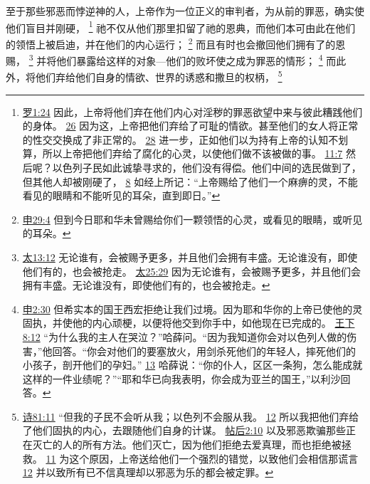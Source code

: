 \documentclass[12pt, a4paper, oneside]{ctexart}
\newcounter{parnum}[section]
\newcommand{\N}{%
   \noindent\refstepcounter{parnum}%
    \makebox[\parindent][l]{\textbf{\arabic{parnum}.}}}
\begin{document}
\N 至于那些邪恶而悖逆神的人，上帝作为一位正义的审判者，为从前的罪恶，确实使他们盲目并刚硬，
	\footnote {
		\href{https://biblehub.com/romans/1-24.htm}{罗1:24} 因此，上帝将他们弃在他们内心对淫秽的罪恶欲望中来与彼此糟践他们的身体。
		\href{https://biblehub.com/romans/1-26.htm}{26} 因为这，上帝把他们弃给了可耻的情欲。甚至他们的女人将正常的性交交换成了非正常的。
		\href{https://biblehub.com/romans/1-28.htm}{28} 进一步，正如他们以为持有上帝的认知不划算，所以上帝把他们弃给了腐化的心灵，以使他们做不该被做的事。
		\href{https://biblehub.com/romans/11-7.htm}{11:7} 然后呢？以色列子民如此诚挚寻求的，他们没有得偿。他们中间的选民做到了，但其他人却被刚硬了，
		\href{https://biblehub.com/romans/11-8.htm}{8} 如经上所记：“上帝赐给了他们一个麻痹的灵，不能看见的眼睛和不能听见的耳朵，直到即日。”
	}
	祂不仅从他们那里扣留了祂的恩典，而他们本可由此在他们的领悟上被启迪，并在他们的内心运行；
	\footnote {
		\href{https://biblehub.com/deuteronomy/29-4.htm}{申29:4} 但到今日耶和华未曾赐给你们一颗领悟的心灵，或看见的眼睛，或听见的耳朵。
	}
	而且有时也会撤回他们拥有了的恩赐，
	\footnote {
		\href{https://biblehub.com/matthew/13-12.htm}{太13:12} 无论谁有，会被赐予更多，并且他们会拥有丰盛。无论谁没有，即使他们有的，也会被抢走。
		\href{https://biblehub.com/matthew/25-29.htm}{太25:29} 因为无论谁有，会被赐予更多，并且他们会拥有丰盛。无论谁没有，即使他们有的，也会被抢走。
	}
	并将他们暴露给这样的对象---他们的败坏使之成为罪恶的情形；
	\footnote {
		\href{https://biblehub.com/deuteronomy/2-30.htm}{申2:30} 但希实本的国王西宏拒绝让我们过境。因为耶和华你的上帝已使他的灵固执，并使他的内心顽梗，以便将他交到你手中，如他现在已完成的。
		\href{https://biblehub.com/2_kings/8-12.htm}{王下8:12} “为什么我的主人在哭泣？”哈薛问。“因为我知道你会对以色列人做的伤害，”他回答。“你会对他们的要塞放火，用剑杀死他们的年轻人，摔死他们的小孩子，剖开他们的孕妇。”
		\href{https://biblehub.com/2_kings/8-13.htm}{13} 哈薛说：“你的仆人，区区一条狗，怎么能成就这样的一件业绩呢？”“耶和华已向我表明，你会成为亚兰的国王，”以利沙回答。
	}
	而此外，将他们弃给他们自身的情欲、世界的诱惑和撒旦的权柄，
	\footnote {
		\href{https://biblehub.com/psalms/81-11.htm}{诗81:11} “但我的子民不会听从我；以色列不会服从我。
		\href{https://biblehub.com/psalms/81-12.htm}{12} 所以我把他们弃给了他们固执的内心，去跟随他们自身的计谋。
		\href{https://biblehub.com/2_thessalonians/2-10.htm}{帖后2:10} 以及邪恶欺骗那些正在灭亡的人的所有方法。他们灭亡，因为他们拒绝去爱真理，而也拒绝被拯救。
		\href{https://biblehub.com/2_thessalonians/2-11.htm}{11} 为这个原因，上帝送给他们一个强烈的错觉，以致他们会相信那谎言
		\href{https://biblehub.com/2_thessalonians/2-12.htm}{12} 并以致所有已不信真理却以邪恶为乐的都会被定罪。
	}
\end{document}
